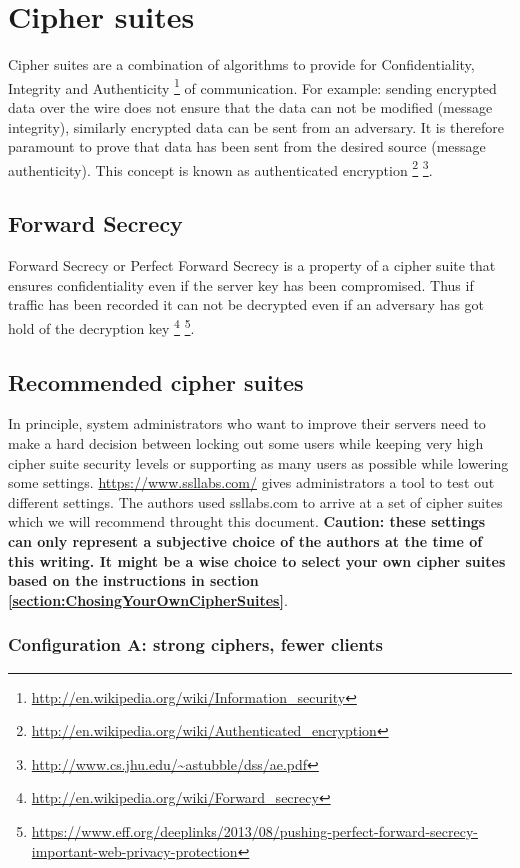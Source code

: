 \section{Cipher suites}

Cipher suites are a combination of algorithms to provide for 
Confidentiality, Integrity and Authenticity
\footnote{\url{http://en.wikipedia.org/wiki/Information\_security}} of 
communication. For example: sending encrypted data over the wire does not 
ensure that the data can not be modified (message integrity), similarly
encrypted data can be sent from an adversary. It is therefore paramount to
prove that data has been sent from the desired source (message authenticity).
This concept is known as authenticated encryption
\footnote{\url{http://en.wikipedia.org/wiki/Authenticated\_encryption}}
\footnote{\url{http://www.cs.jhu.edu/~astubble/dss/ae.pdf}}.

\subsection{Forward Secrecy}
Forward Secrecy or Perfect Forward Secrecy is a property of a cipher suite 
that ensures confidentiality even if the server key has been compromised.
Thus if traffic has been recorded it can not be decrypted even if an adversary
has got hold of the decryption key
\footnote{\url{http://en.wikipedia.org/wiki/Forward\_secrecy}}
\footnote{\url{https://www.eff.org/deeplinks/2013/08/pushing-perfect-forward-secrecy-important-web-privacy-protection}}. 

\subsection{Recommended cipher suites}

In principle, system administrators who want to improve their servers need to
make a hard decision between locking out some users while keeping very high
cipher suite security levels or supporting as many users as possible while
lowering some settings. \url{https://www.ssllabs.com/} gives administrators a
tool to test out different settings. The authors used ssllabs.com to arrive at
a set of cipher suites which we will recommend throught this document.
\textbf{Caution: these settings can only represent a subjective choice of the
authors at the time of this writing. It might be a wise choice to select your
own cipher suites based on the instructions in section
\ref{section:ChosingYourOwnCipherSuites}}.


\subsubsection{Configuration A: strong ciphers, fewer clients}

